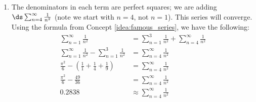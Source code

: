 \begin{example}
\begin{enumerate}
\item		The denominators in each term are perfect squares; we are adding $\ds \sum_{n=4}^\infty \frac{1}{n^2}$ (note  we start with $n=4$, not $n=1$). This series will converge. Using the formula from Concept \ref{idea:famous_series}, we have the following:
\begin{align*}
\sum_{n=1}^\infty \frac1{n^2} &= \sum_{n=1}^3 \frac1{n^2} +\sum_{n=4}^\infty \frac1{n^2} \\
\sum_{n=1}^\infty \frac1{n^2} - \sum_{n=1}^3 \frac1{n^2} &=\sum_{n=4}^\infty \frac1{n^2} \\
\frac{\pi^2}{6} - \left(\frac11+\frac14+\frac19\right) &= \sum_{n=4}^\infty \frac1{n^2} \\
\frac{\pi^2}{6} - \frac{49}{36} &= \sum_{n=4}^\infty \frac1{n^2} \\
0.2838&\approx \sum_{n=4}^\infty \frac1{n^2} 
\end{align*}
\end{enumerate}

\end{example}